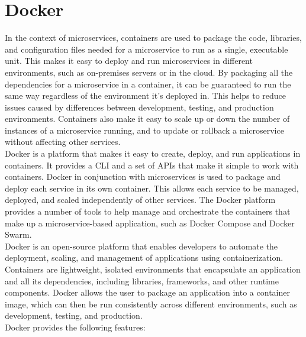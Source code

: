 \section{Docker}
In the context of microservices, containers are used to package the code, libraries, and configuration files needed for a microservice to run as a single, executable unit. This makes it easy to deploy and run microservices in different environments, such as on-premises servers or in the cloud. By packaging all the dependencies for a microservice in a container, it can be guaranteed to run the same way regardless of the environment it's deployed in. This helps to reduce issues caused by differences between development, testing, and production environments. Containers also make it easy to scale up or down the number of instances of a microservice running, and to update or rollback a microservice without affecting other services.\vspace{5mm} \\
Docker is a platform that makes it easy to create, deploy, and run applications in containers. It provides a \ac{CLI} and a set of \acp{API} that make it simple to work with containers. Docker in conjunction with microservices is used to package and deploy each service in its own container. This allows each service to be managed, deployed, and scaled independently of other services. The Docker platform provides a number of tools to help manage and orchestrate the containers that make up a microservice-based application, such as Docker Compose and Docker Swarm.\vspace{5mm} \\
Docker is an open-source platform that enables developers to automate the deployment, scaling, and management of applications using containerization. Containers are lightweight, isolated environments that encapsulate an application and all its dependencies, including libraries, frameworks, and other runtime components. Docker allows the user to package an application into a container image, which can then be run consistently across different environments, such as development, testing, and production.\vspace{5mm} \\
Docker provides the following features:
